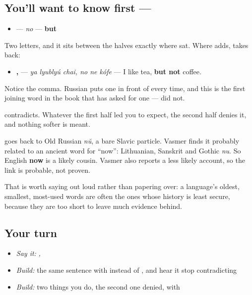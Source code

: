\subsection*{You'll want to know first — }
\begin{itemize}
\raggedright
  \item \textbf{} — \emph{no} — \textbf{but}
\end{itemize}

Two letters, and it sits between the halves exactly where \textbf{} sat. Where \textbf{} adds, \textbf{} takes back:

\begin{itemize}
\raggedright
  \item \textbf{  ,   } — \emph{ya lyublyú chai, no ne kófe} — I like tea, \textbf{but not} coffee.
\end{itemize}

Notice the comma. Russian puts one in front of \textbf{} every time, and this is the first joining word in the book that has asked for one — \textbf{} did not.

\textbf{} contradicts. Whatever the first half led you to expect, the second half denies it, and nothing softer is meant.

\begin{cousinweb}
\textbf{} goes back to Old Russian \emph{nŭ}, a bare Slavic particle. Vasmer finds it probably related to an ancient word for \textquotedblleft{}now\textquotedblright{}: Lithuanian, Sanskrit and Gothic \emph{nu}. So English \textbf{now} is a likely cousin. Vasmer also reports a less likely account, so the link is probable, not proven.

That is worth saying out loud rather than papering over: a language's oldest, smallest, most-used words are often the ones whose history is least secure, because they are too short to leave much evidence behind.
\end{cousinweb}

\subsection*{Your turn}
\begin{itemize}
\raggedright
  \item \emph{Say it:} \emph{  ,   }
  \item \emph{Build:} the same sentence with \textbf{} instead of \textbf{}, and hear it stop contradicting
  \item \emph{Build:} two things you do, the second one denied, with \textbf{ }
\end{itemize}

